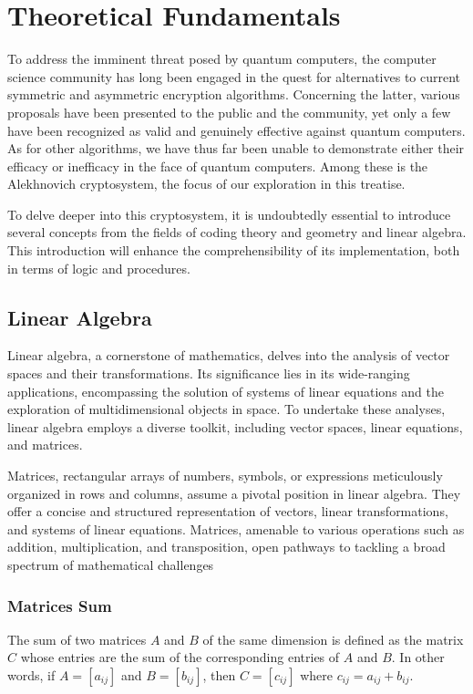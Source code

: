 \chapter{Theoretical Fundamentals}

To address the imminent threat posed by quantum computers, the computer science 
community has long been engaged in the quest for alternatives to current symmetric and asymmetric encryption algorithms. Concerning the latter, various proposals have been presented to the public and the community, yet only a few have been recognized as valid and genuinely effective against quantum computers. As for other algorithms, we have thus far been unable to demonstrate either their efficacy or inefficacy in the face of quantum computers. Among these is the Alekhnovich cryptosystem, the focus of our exploration in this treatise.

To delve deeper into this cryptosystem, it is undoubtedly essential to introduce several concepts from the fields of coding theory and geometry and linear algebra. This introduction will enhance the comprehensibility of its implementation, both in terms of logic and procedures.

\section{Linear Algebra}
Linear algebra, a cornerstone of mathematics, delves into the analysis of vector spaces and their transformations. Its significance lies in its wide-ranging applications, encompassing the solution of systems of linear equations and the exploration of multidimensional objects in space. To undertake these analyses, linear algebra employs a diverse toolkit, including vector spaces, linear equations, and matrices.

Matrices, rectangular arrays of numbers, symbols, or expressions meticulously organized in rows and columns, assume a pivotal position in linear algebra. They offer a concise and structured representation of vectors, linear transformations, and systems of linear equations. Matrices, amenable to various operations such as addition, multiplication, and transposition, open pathways to tackling a broad spectrum of mathematical challenges
\subsection{Matrices Sum}
The sum of two matrices $A$ and $B$ of the same dimension is defined as the matrix $C$ whose entries are the sum of the corresponding entries of $A$ and $B$. In other words, if $A = [a_{ij}]$ and $B = [b_{ij}]$, then $C = [c_{ij}]$ where $c_{ij} = a_{ij} + b_{ij}$.

